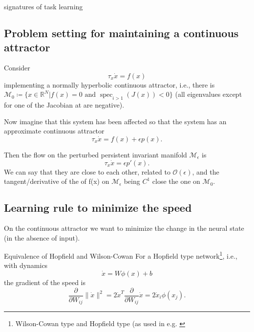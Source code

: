 \documentclass{article}
\theoremstyle{definition} \newtheorem{definition}{Definition}
\theoremstyle{remark} \newtheorem{remark}{Remark}
\newcommand{\reals}{\mathbb{R}}
\newcommand{\manifold}{\mathcal{M}}
\newcommand{\spec}{\operatorname{spec}}
\newcounter{ct}
\begin{document}
\cite{bell2024discovering} \citep{shervani2023meta}
\citep{chadwick2023learning}

signatures of task learning \citep{gurnani2023task}

\subsection{Problem setting for maintaining a continuous attractor}

Consider 
\begin{equation}\label{eq:ode}
\tau_x\dot x = f(x) 
\end{equation}
implementing a normally hyperbolic continuous attractor, i.e., there is $\manifold_0\coloneqq \{x \in \reals^N | f(x) = 0 \text{ and } \spec_{i>1}(J(x)) <0\}$  (all eigenvalues except for one of the Jacobian at are negative). 

Now imagine that this system has been affected so that the system has an approximate continuous attractor
\begin{equation}\label{eq:ode_pert}
\tau_x\dot x = f(x)  + \epsilon p(x).
\end{equation}

Then the flow on the perturbed persistent invariant manifold $\manifold_\epsilon$ is
\begin{equation}\label{eq:ode_pert}
\tau_x\dot x = \epsilon p'(x).
\end{equation}
We can say that they are close to each other, related to $\mathcal{O}(\epsilon)$, and the tangent/derivative of the of f(x) on $\manifold_\epsilon$ being $C^1$ close the one on $\manifold_0$.




\subsection{Learning rule to minimize the speed}%
On the continuous attractor we want to minimize the change in the neural state (in the absence of input).

Equivalence of Hopfield and Wilson-Cowan\citep{miller2012mathematical}
For a Hopfield type network\footnote{Wilson-Cowan type and Hopfield type (as used in e.g. \citep{gort2024emergence}}, i.e., with dynamics 
\begin{equation}\label{sec:hopfieldode}
\dot x = W\phi(x) + b
\end{equation}
 the gradient of the speed is
\begin{equation}
\frac{\partial}{\partial W_{ij}}\|\dot x \|^2 = 2 \dot x^T \frac{\partial}{\partial W_{ij}}\dot x = 2 \dot x_i\phi(x_j).
\end{equation}
\end{document}
